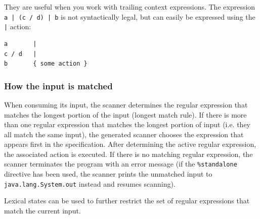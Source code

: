 \documentclass[11pt]{scrartcl}
\begin{document}
They are useful when you work with trailing context expressions. The 
expression \texttt{a | (c / d) | b} is not syntactically legal, but can 
easily be expressed using the \verb+|+ action:
\begin{verbatim}
a       |
c / d   |
b       { some action }
\end{verbatim}

\subsubsection{How the input is matched\label{HowMatched}}
When consuming its input, the scanner determines the regular expression
that matches the longest portion of the input (longest match rule). If
there is more than one regular expression that matches the longest portion
of input (i.e. they all match the same input), the generated scanner chooses
the expression that appears first in the specification. After determining
the active regular expression, the associated action is executed. If there
is no matching regular expression, the scanner terminates the program with
an error message (if the \texttt{\%standalone} directive has been used, the
scanner prints the unmatched input to \texttt{java.lang.System.out} instead
and resumes scanning). 

Lexical states can be used to further restrict the set of regular expressions
that match the current input. 
 
\end{document}

